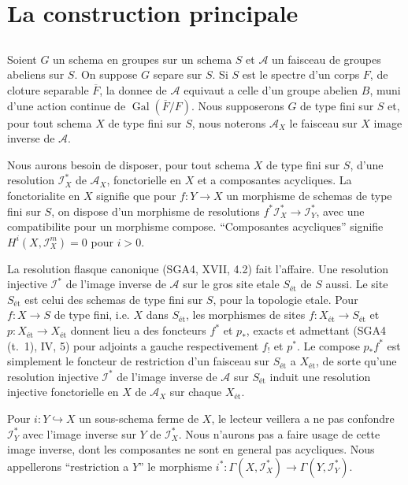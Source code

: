 \documentclass[11pt,a4paper]{article}
\theoremstyle{plain}
\theoremstyle{definition}
\DeclareMathOperator{\Gal}{Gal}
\newcommand{\et}{\text{\'et}}
\begin{document}
\section{La construction principale}

\subsection{}\label{2.1}

Soient $G$ un schema en groupes sur un schema $S$ et $\mathscr{A}$ un faisceau de groupes abeliens sur $S$. On suppose $G$ separe sur $S$. Si $S$ est le spectre d'un corps $F$, de cloture separable $\overline{F}$, la donnee de $\mathscr{A}$ equivaut a celle d'un groupe abelien $B$, muni d'une action continue de $\Gal(\overline{F}/F)$. Nous supposerons $G$ de type fini sur $S$ et, pour tout schema $X$ de type fini sur $S$, nous noterons $\mathscr{A}_X$ le faisceau sur $X$ image inverse de $\mathscr{A}$.

Nous aurons besoin de disposer, pour tout schema $X$ de type fini sur $S$, d'une resolution $\mathscr{I}_X^*$ de $\mathscr{A}_X$, fonctorielle en $X$ et a composantes acycliques. La fonctorialite en $X$ signifie que pour $f : Y \to X$ un morphisme de schemas de type fini sur $S$, on dispose d'un morphisme de resolutions $f^* \mathscr{I}_X^* \to \mathscr{I}_Y^*$, avec une compatibilite pour un morphisme compose. ``Composantes acycliques'' signifie $H^i(X, \mathscr{I}_X^m) = 0$ pour $i > 0$.

La resolution flasque canonique (SGA4, XVII, 4.2) fait l'affaire. Une resolution injective $\mathscr{I}^*$ de l'image inverse de $\mathscr{A}$ sur le gros site etale $S_{\et}$ de $S$ aussi. Le site $S_{\et}$ est celui des schemas de type fini sur $S$, pour la topologie etale. Pour $f : X \to S$ de type fini, i.e. $X$ dans $S_{\et}$, les morphismes de sites $f : X_{\et} \to S_{\et}$ et $p : X_{\et} \to X_{\et}$ donnent lieu a des foncteurs $f^*$ et $p_*$, exacts et admettant (SGA4 (t.~1), IV, 5) pour adjoints a gauche respectivement $f_!$ et $p^*$. Le compose $p_* f^*$ est simplement le foncteur de restriction d'un faisceau sur $S_{\et}$ a $X_{\et}$, de sorte qu'une resolution injective $\mathscr{I}^*$ de l'image inverse de $\mathscr{A}$ sur $S_{\et}$ induit une resolution injective fonctorielle en $X$ de $\mathscr{A}_X$ sur chaque $X_{\et}$.

Pour $i : Y \hookrightarrow X$ un sous-schema ferme de $X$, le lecteur veillera a ne pas confondre $\mathscr{I}_Y^*$ avec l'image inverse sur $Y$ de $\mathscr{I}_X^*$. Nous n'aurons pas a faire usage de cette image inverse, dont les composantes ne sont en general pas acycliques. Nous appellerons ``restriction a $Y$'' le morphisme $i^* : \Gamma(X, \mathscr{I}_X^*) \to \Gamma(Y, \mathscr{I}_Y^*)$.
\end{document}
